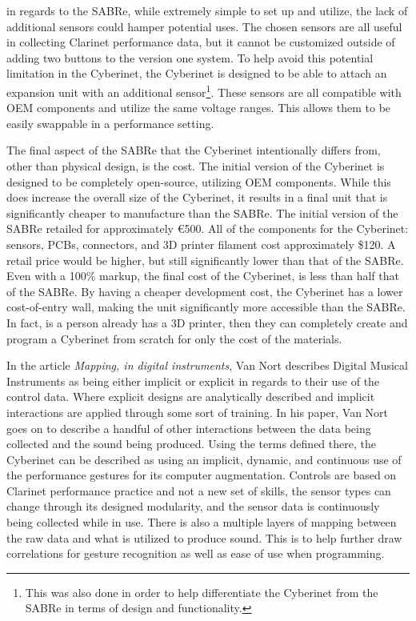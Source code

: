 in regards to the SABRe, while extremely simple to set up and utilize, the lack of additional sensors could hamper potential uses. The chosen sensors are all useful in collecting Clarinet performance data, but it cannot be customized outside of adding two buttons to the version one system. To help avoid this potential limitation in the Cyberinet, the Cyberinet is designed to be able to attach an expansion unit with an additional sensor\footnote{This was also done in order to help differentiate the Cyberinet from the SABRe in terms of design and functionality.}. These sensors are all compatible with OEM components and utilize the same voltage ranges. This allows them to be easily swappable in a performance setting.

The final aspect of the SABRe that the Cyberinet intentionally differs from, other than physical design, is the cost. The initial version of the Cyberinet is designed to be completely open-source, utilizing OEM components. While this does increase the overall size of the Cyberinet, it results in a final unit that is significantly cheaper to manufacture than the SABRe. The initial version of the SABRe retailed for approximately €500. All of the components for the Cyberinet: sensors, PCBs, connectors, and 3D printer filament cost approximately \$120. A retail price would be higher, but still significantly lower than that of the SABRe. Even with a 100\% markup, the final cost of the Cyberinet, is less than half that of the SABRe. By having a cheaper development cost, the Cyberinet has a lower cost-of-entry wall, making the unit significantly more accessible than the SABRe. In fact, is a person already has a 3D printer, then they can completely create and program a Cyberinet from scratch for only the cost of the materials.

In the article \textit{Mapping, in digital instruments}\cite{vanNortMapping2007}, Van Nort describes Digital Musical Instruments as being either implicit or explicit in regards to their use of the control data. Where explicit designs are analytically described and implicit interactions are applied through some sort of training\cite{vanNortMapping2007}. In his paper, Van Nort goes on to describe a handful of other interactions between the data being collected and the sound being produced. Using the terms defined there, the Cyberinet can be described as using an implicit, dynamic, and continuous use of the performance gestures for its computer augmentation. Controls are based on Clarinet performance practice and not a new set of skills, the sensor types can change through its designed modularity, and the sensor data is continuously being collected while in use. There is also a multiple layers of mapping between the raw data and what is utilized to produce sound. This is to help further draw correlations for gesture recognition as well as ease of use when programming.


